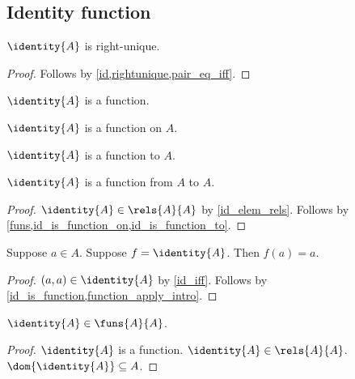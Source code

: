 \subsection{Identity function}

\begin{proposition}\label{id_rightunique}
    $\identity{A}$ is right-unique.
\end{proposition}
\begin{proof}
    Follows by \cref{id,rightunique,pair_eq_iff}.
\end{proof}

\begin{proposition}\label{id_is_function}
    $\identity{A}$ is a function.
\end{proposition}

\begin{proposition}\label{id_is_function_on}
    $\identity{A}$ is a function on $A$.
\end{proposition}

\begin{proposition}\label{id_is_function_to}
    $\identity{A}$ is a function to $A$.
\end{proposition}

\begin{proposition}\label{id_is_function_from_to}
    $\identity{A}$ is a function from $A$ to $A$.
\end{proposition}
\begin{proof}
    $\identity{A}\in\rels{A}{A}$ by \cref{id_elem_rels}.
    Follows by \cref{funs,id_is_function_on,id_is_function_to}.
\end{proof}

\begin{proposition}\label{id_apply}
    Suppose $a\in A$.
    Suppose $f = \identity{A}$.
    Then $f(a) = a$.
\end{proposition}
\begin{proof}
    $(a,a)\in\identity{A}$ by \cref{id_iff}.
    Follows by \cref{id_is_function,function_apply_intro}.
\end{proof}

\begin{proposition}\label{id_elem_funs}
    $\identity{A}\in\funs{A}{A}$.
\end{proposition}
\begin{proof}
    $\identity{A}$ is a function.
    $\identity{A}\in\rels{A}{A}$.
    $\dom{\identity{A}}\subseteq A$.
\end{proof}



